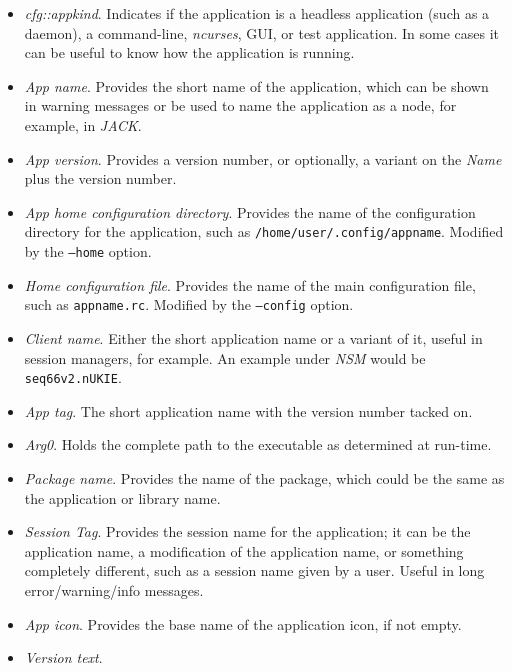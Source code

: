    \begin{itemize}
      \item \textsl{cfg::appkind}.
         Indicates if the application is a headless application (such as a
         daemon), a command-line, \textsl{ncurses}, GUI, or test application.
         In some cases it can be useful to know how the application is
         running.
      \item \textsl{App name}.
         Provides the short name of the application, which can be shown
         in warning messages or be used to name the application as a node, for
         example, in \textsl{JACK}.
      \item \textsl{App version}.
         Provides a version number, or optionally, a variant on the
         \textsl{Name} plus the version number.
      \item \textsl{App home configuration directory}.
         Provides the name of the configuration directory for the application,
         such as \texttt{/home/user/.config/appname}.
         Modified by the \texttt{--home} option.
      \item \textsl{Home configuration file}.
         Provides the name of the main configuration file, such as
         \texttt{appname.rc}.
         Modified by the \texttt{--config} option.
      \item \textsl{Client name}.
         Either the short application name or a variant of it, useful in session
         managers, for example.
         An example under \textsl{NSM} would be \texttt{seq66v2.nUKIE}.
      \item \textsl{App tag}.
         The short application name with the version number tacked on.
      \item \textsl{Arg0}.
         Holds the complete path to the executable as determined at run-time.
      \item \textsl{Package name}.
         Provides the name of the package, which could be the same as the
         application or library name.
      \item \textsl{Session Tag}.
         Provides the session name for the application; it can be the
         application name, a modification of the application name, or
         something completely different, such as a session name given by
         a user.
         Useful in long error/warning/info messages.
      \item \textsl{App icon}.
         Provides the base name of the application icon, if not empty.
      \item \textsl{Version text}.

\end{itemize}
